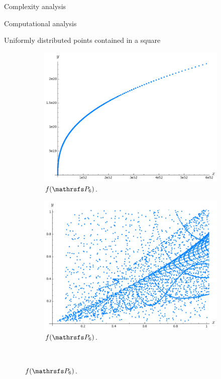 \documentclass[11pt, a4paper, english, twoside, notitlepage, openright]{report}
\begin{document}
\begin{chapter}{Complexity analysis}
\begin{section}{Computational analysis}
\begin{subsection}{Uniformly distributed points contained in a square}
\begin{figure}
\hspace{-0.1cm}
\begin{subfigure}{.49\linewidth}\centering
\includegraphics[width=1\textwidth]{plots/ch5_19_P6.png}
\vspace{0cm}\caption{$f(\PP_6)$.\label{fig:fP6_1}}
\end{subfigure}
\begin{subfigure}{.49\linewidth}\centering
\includegraphics[width=1\textwidth]{plots/ch5_20_P6prime.png}
\vspace{0cm}\caption{$f(\PP_6)$.\label{fig:fP6_2}}
\end{subfigure}\\[1ex]
\vspace{0.4cm}


\end{figure}
\end{subsection}
\end{section}
\end{chapter}
\end{document}
